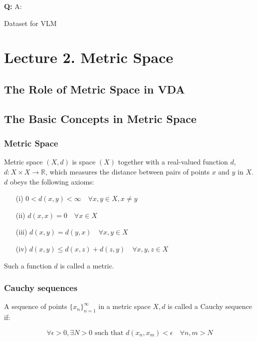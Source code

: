 \textbf{Q: }
A: 











Dataset for VLM

\section{Lecture 2. Metric Space}
\subsection{The Role of Metric Space in VDA}
\subsection{The Basic Concepts in Metric Space}
\pagebreak
\subsubsection{Metric Space}

Metric space $(X, d)$ is space $(X)$ together with a real-valued function \(d\), \(d: X \times X \rightarrow \mathbb{R}\), which measures the distance between pairs of points \(x\) and \(y\) in \(X\).\\
 \(d\) obeys the following axioms:

\begin{itemize}
    \item[(i)] \(0 < d(x, y) < \infty \quad \forall x, y \in X, x \neq y\)
    \item[(ii)] \(d(x, x) = 0 \quad \forall x \in X\)
    \item[(iii)] \(d(x, y) = d(y, x) \quad \forall x, y \in X\)
    \item[(iv)] \(d(x, y) \leq d(x, z) + d(z, y) \quad \forall x, y, z \in X\)
\end{itemize}

Such a function \(d\) is called a metric.

\subsubsection{Cauchy sequences}

A sequence of points \(\{x_n\}_{n=1}^\infty\) in a metric space \(X, d\) is called a Cauchy sequence if:

\[
\forall \epsilon > 0, \exists N > 0 \text{ such that } d(x_n, x_m) < \epsilon \quad \forall n, m > N
\]
